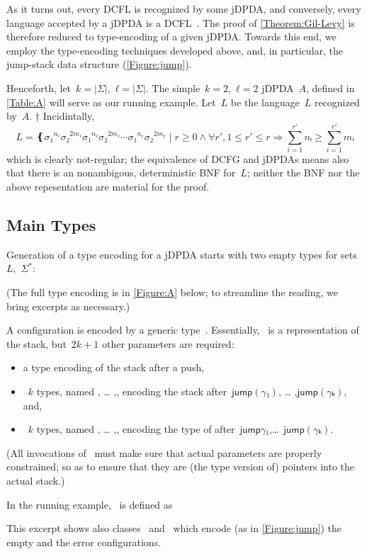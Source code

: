 As it turns out, every DCFL is recognized by some jDPDA, and conversely, 
  every language accepted by a jDPDA
  is a DCFL~\cite{Courcelle:77}.
The proof of \cref{Theorem:Gil-Levy} is therefore reduced to type-encoding of a given jDPDA.
Towards this end, we employ the type-encoding techniques developed above, and, in particular, the jump-stack data structure (\cref{Figure:jump}).

Henceforth, let~$k =|Σ|$,~$ℓ=|Σ|$.
The simple~$k=2$,~$ℓ=2$ jDPDA~$A$, defined in \cref{Table:A} will serve as our running example.
Let~$L$ be the language~$L$ recognized by~$A$.%
†{
  Incidintally,
\[
  L = ❴ σ₁^{n₁}σ₂^{2m₁} σ₁^{n₂}σ₂^{2m₂} ⋯ σ₁^{n_r}σ₂^{2m_r} \; | \; r≥0∧∀r', 1≤r'≤r⇒\sum_{i=1}^{r'} nᵢ≥\sum_{i=1}^{r'} mᵢ
\]
which is clearly not-regular; the equivalence of DCFG and jDPDAs means also that there is an nonambigous, deterministic
BNF for~$L$; neither the BNF nor the above repesentation are material for the proof.
}

\subsection{Main Types}
Generation of a type encoding for a jDPDA starts with two empty types for sets~$L$,~$Σ^*$:
\begin{quote}
\end{quote}
(The full type encoding is in \cref{Figure:A} below; to streamline the reading, we bring
  excerpts as necessary.)

A configuration is encoded by a generic type~.
Essentially,~ is a representation of the stack,
  but~$2k+1$ other parameters are required:
\begin{itemize}
  \item {} a type encoding of the stack after a push,
  \item~$k$ types, named , … ,, encoding the stack
        after~$\textsf{jump}(γ₁)$, … ,$\textsf{jump}(γₖ)$, and,
  \item~$k$ types, named , … ,, encoding the type of 
    after~$\textsf{jump}{γ₁}$,…~$\textsf{jump}(γₖ)$.
\end{itemize}
(All invocations of~ must make sure that actual parameters are properly constrained;
so as to ensure that they are (the type version of) pointers into the actual stack.)

In the running example,~ is defined as
\begin{quote}
\end{quote}
This excerpt shows also classes~ and~ which encode (as in \cref{Figure:jump})
  the empty and the error configurations.

